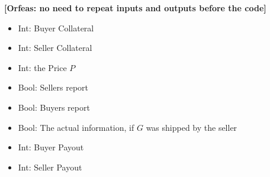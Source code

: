 \documentclass{cacthesis}
\newcommand{\authnote}[3]{{ \footnotesize \textbf{#1[#2: #3]~}}}
\newcommand{\orfnote}[1]{\authnote{\color{blue}}{Orfeas}{#1}}
\begin{document}
\orfnote{no need to repeat inputs and outputs before the code}
\begin{itemize}
\item{Int: Buyer Collateral}
\item{Int: Seller Collateral}
\item{Int: the Price $P$}
\item{Bool: Sellers report}
\item{Bool: Buyers report}
\item{Bool: The actual information, if $G$ was shipped by the seller}
\end{itemize}

\begin{itemize}
\item{Int: Buyer Payout}
\item{Int: Seller Payout}
\end{itemize}

\end{document}
